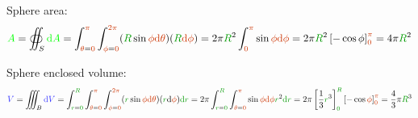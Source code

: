 Sphere area:
\[
\area{A}
= \oiint_S \area{\d A}
= \int_{\angle{\theta}=\angle{0}}^{\angle{\pi}}
  \int_{\angle{\phi}=\angle{0}}^{\angle{2\pi}}
  (\dist{R} \sin \angle{\phi} \angle{\d \theta})
  (\dist{R} \angle{\d \phi})
= 2\pi \dist{R}^2 \int_{\angle{0}}^{\angle{\pi}} \sin \angle{\phi} \angle{\d \phi}
= 2\pi \dist{R}^2 \left[ - \cos \phi \right]_{\angle{0}}^{\angle{\pi}}
= 4\pi \dist{R}^2
\]

Sphere enclosed volume:
\[
\vol{V}
= \iiint_B \vol{\d V}
= \int_{\dist{r}=\dist{0}}^{\dist{R}}
  \int_{\angle{\theta}=\angle{0}}^{\angle{\pi}}
  \int_{\angle{\phi}=\angle{0}}^{\angle{2\pi}}
  (\dist{r} \sin \angle{\phi} \angle{\d \theta}) (\dist{r} \d \angle{\phi}) \dist{\d r}
= 2 \pi
  \int_{\dist{r}=\dist{0}}^{\dist{R}}
  \int_{\angle{\theta}=\angle{0}}^{\angle{\pi}} \sin \angle{\phi} \angle{\d \phi} \dist{r}^2 \dist{\d r}
= 2 \pi
  \left[\frac 1 3 \dist{r}^3\right]_{\dist{0}}^{\dist{R}}
  \left[- \cos \angle{\phi}\right]_{\angle{0}}^{\angle{\pi}}
= \frac 4 3 \pi \dist{R}^3
\]
